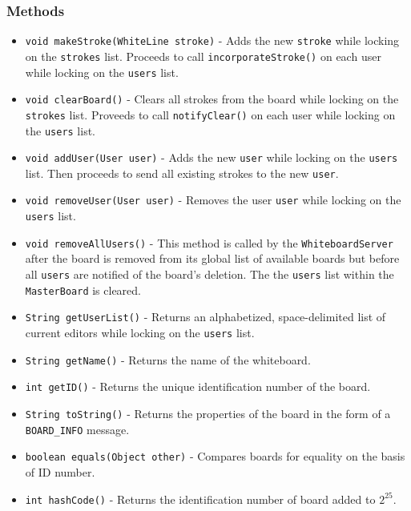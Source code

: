 \subsubsection{Methods}
\begin{itemize}
\item \texttt{void makeStroke(WhiteLine stroke)} - Adds the new \texttt{stroke} while locking on the \texttt{strokes} list. Proceeds to call \texttt{incorporateStroke()} on each user while locking on the \texttt{users} list.
\item \texttt{void clearBoard()} - Clears all strokes from the board while locking on the \texttt{strokes} list. Proveeds to call \texttt{notifyClear()} on each user while locking on the \texttt{users} list.
\item \texttt{void addUser(User user)} - Adds the new \texttt{user} while locking on the \texttt{users} list. Then proceeds to send all existing strokes to the new \texttt{user}.
\item \texttt{void removeUser(User user)} - Removes the user \texttt{user} while locking on the \texttt{users} list.
\item \texttt{void removeAllUsers()} - This method is called by the \texttt{WhiteboardServer} after the board is removed from its global list of available boards but before all \texttt{users} are notified of the board's deletion. The the \texttt{users} list within the \texttt{MasterBoard} is cleared.
\item \texttt{String getUserList()} - Returns an alphabetized, space-delimited list of current editors while locking on the \texttt{users} list.
\item \texttt{String getName()} - Returns the name of the whiteboard.
\item \texttt{int getID()} - Returns the unique identification number of the board.
\item \texttt{String toString()} - Returns the properties of the board in the form of a \texttt{BOARD\_INFO} message.
\item \texttt{boolean equals(Object other)} - Compares boards for equality on the basis of ID number.
\item \texttt{int hashCode()} - Returns the identification number of board added to $2^{25}$.
\end{itemize}

